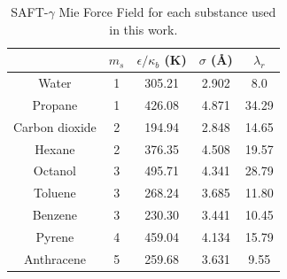 \begin{table}[h]
	\centering
	\caption{SAFT-$\gamma$ Mie Force Field for each substance used in this work.}
	\label{tbl:parameters}
	\begin{tabular}{ccccc}
		\hline
		\hline
		& $m_s$ & $\epsilon/\kappa_{b}$ (K) & $\sigma$ (\AA) & $\lambda_r$ \\ \hline\hline
		Water          & 1     & 305.21               & 2.902              & 8.0         \\
		Propane        & 1     & 426.08               & 4.871              & 34.29       \\
		Carbon dioxide & 2     & 194.94               & 2.848              & 14.65       \\
		Hexane         & 2     & 376.35               & 4.508              & 19.57       \\
		Octanol        & 3     & 495.71               & 4.341              & 28.79       \\
		Toluene        & 3     & 268.24               & 3.685              & 11.80       \\
		Benzene        & 3     & 230.30               & 3.441              & 10.45       \\
		Pyrene         & 4     & 459.04               & 4.134              & 15.79       \\
		Anthracene     & 5     & 259.68               & 3.631              & 9.55        \\ 
		\hline
		\hline
	\end{tabular}
	
\end{table}
\FloatBarrier
